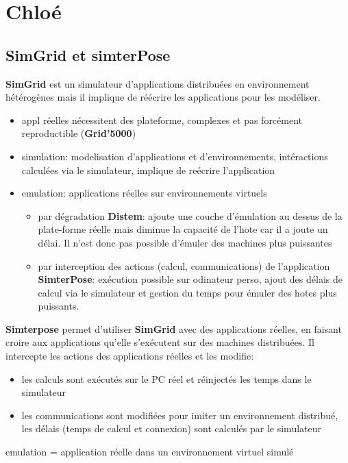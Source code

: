\documentclass{article}
\begin{document}
\section{Chloé}
\subsection{SimGrid et simterPose}
\textbf{SimGrid} est un simulateur d'applications distribuées en environnement hétérogènes mais il implique de réécrire les applications pour les modéliser.

\begin{itemize}
\item appl réelles nécessitent des plateforme, complexes et pas forcément
  reproductible (\textbf{Grid'5000})
\item simulation: modelisation d'applications et d'environnements, intéractions
  calculées via le simulateur, implique de reécrire l'application
\item emulation: applications réelles sur environnements virtuels
\begin{itemize}
\item par dégradation \textbf{Distem}: ajoute une couche d'émulation au dessus de la plate-forme réelle mais diminue la capacité de l'hote car il a joute un délai. Il n'est donc pas possible d'émuler des machines plus puissantes
\item par interception des actions (calcul, communications) de l'application \textbf{SimterPose}: exécution possible sur odinateur perso, ajout des délais de calcul via le simulateur et gestion du temps pour émuler des hotes plus puissants.
\end{itemize}
\end{itemize}

\textbf{Simterpose} permet d'utiliser \textbf{SimGrid} avec des applications réelles, en faisant croire aux applications qu'elle s'exécutent sur des machines distribuées. Il intercepte les actions des applications réelles et les modifie:
\begin{itemize}
\item les calculs sont exécutés sur le PC réel et réinjectés les temps dans le simulateur
\item les communications sont modifiées pour imiter un environnement distribué, les délais (temps de calcul et connexion) sont calculés par le simulateur
\end{itemize}

{\color{red} emulation = application réelle dans un environnement virtuel simulé}
\end{document}
